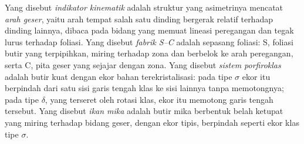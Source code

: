 \begin{definition}\label{def:b3:deformation-mechanisms:kinematic}
Yang disebut \emph{indikator kinematik} adalah struktur yang
asimetrinya mencatat \emph{arah geser}, yaitu arah tempat
salah satu dinding  bergerak relatif terhadap dinding lainnya, dibaca pada bidang
yang memuat lineasi peregangan dan tegak lurus terhadap foliasi.
Yang disebut \emph{fabrik S--C} adalah sepasang foliasi: S, foliasi
butir yang terpipihkan, miring terhadap zona dan berbelok ke arah
peregangan, serta C, pita geser yang sejajar dengan zona. Yang disebut
\emph{sistem porfiroklas} adalah butir kuat dengan
ekor bahan terekristalisasi: pada tipe $\sigma$ ekor itu berpindah dari satu
sisi garis tengah klas ke sisi lainnya tanpa memotongnya; pada tipe $\delta$,
yang terseret oleh rotasi klas, ekor itu memotong garis tengah tersebut. Yang disebut
\emph{ikan mika} adalah butir mika berbentuk belah ketupat yang miring
terhadap bidang geser, dengan ekor tipis, berpindah seperti ekor klas tipe $\sigma$.
\end{definition}


